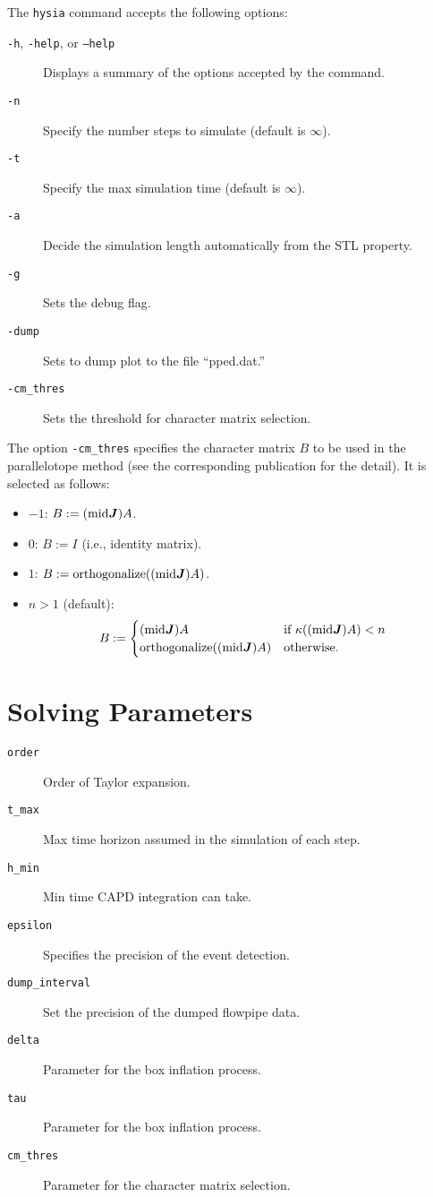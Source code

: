 \documentclass[10pt,a4paper]{article}
\begin{document}
The \texttt{hysia} command accepts the following options:
\begin{description}
\item[\texttt{-h}, \texttt{-help}, or \texttt{--help}] Displays a summary of the options accepted by the command.
\item[\texttt{-n}] Specify the number steps to simulate (default is $\infty$).
\item[\texttt{-t}] Specify the max simulation time (default is $\infty$).
\item[\texttt{-a}] Decide the simulation length automatically from the STL property.
\item[\texttt{-g}] Sets the debug flag.
\item[\texttt{-dump}] Sets to dump plot to the file ``pped.dat.''
\item[\texttt{-cm_thres}] Sets the threshold for character matrix selection.
\end{description}

The option \texttt{-cm_thres} specifies the character matrix $B$ to be used in the parallelotope method (see the corresponding publication for the detail). It is selected as follows:
\begin{itemize}
	\item $-1$: $B := (\mathrm{mid}\J) A$.
	\item $0$: $B := I$ (i.e., identity matrix).
	\item $1$: $B := \mathrm{orthogonalize}((\mathrm{mid}\J) A)$.
	\item $n > 1$ (default): 
		\[
			B := \begin{cases}
				(\mathrm{mid}\J) A & \text{if $\kappa((\mathrm{mid}\J) A) < n$} \\
				\mathrm{orthogonalize}((\mathrm{mid}\J) A) & \text{otherwise.}
			\end{cases}
		\]
\end{itemize}


\section{Solving Parameters}

\begin{description}
\item[\texttt{order}] Order of Taylor expansion.
\item[\texttt{t_max}] Max time horizon assumed in the simulation of each step.
\item[\texttt{h_min}] Min time CAPD integration can take.
\item[\texttt{epsilon}] Specifies the precision of the event detection.
\item[\texttt{dump_interval}] Set the precision of the dumped flowpipe data.
\item[\texttt{delta}] Parameter for the box inflation process.
\item[\texttt{tau}] Parameter for the box inflation process.
\item[\texttt{cm_thres}] Parameter for the character matrix selection.
\end{description}
\end{document}
